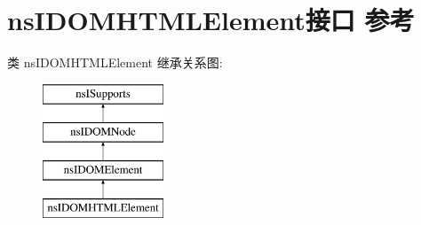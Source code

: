 \hypertarget{interfacens_i_d_o_m_h_t_m_l_element}{}\section{ns\+I\+D\+O\+M\+H\+T\+M\+L\+Element接口 参考}
\label{interfacens_i_d_o_m_h_t_m_l_element}
类 ns\+I\+D\+O\+M\+H\+T\+M\+L\+Element 继承关系图\+:\begin{figure}[H]
\begin{center}
\leavevmode
\includegraphics[height=4.000000cm]{interfacens_i_d_o_m_h_t_m_l_element}
\end{center}
\end{figure}

